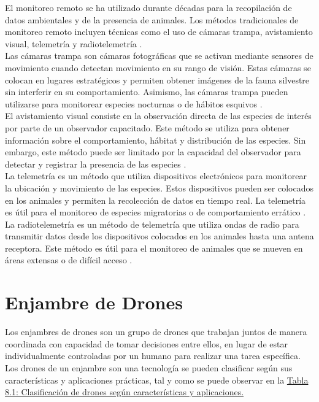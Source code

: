 El monitoreo remoto se ha utilizado durante décadas para la recopilación de datos ambientales y de la presencia de animales. Los métodos tradicionales de monitoreo remoto incluyen técnicas como el uso de cámaras trampa, avistamiento visual, telemetría y radiotelemetría \cite{46}.\\
Las cámaras trampa son cámaras fotográficas que se activan mediante sensores de movimiento cuando detectan movimiento en su rango de visión. Estas cámaras se colocan en lugares estratégicos y permiten obtener imágenes de la fauna silvestre sin interferir en su comportamiento. Asimismo, las cámaras trampa pueden utilizarse para monitorear especies nocturnas o de hábitos esquivos \cite{47}.\\
El avistamiento visual consiste en la observación directa de las especies de interés por parte de un observador capacitado. Este método se utiliza para obtener información sobre el comportamiento, hábitat y distribución de las especies. Sin embargo, este método puede ser limitado por la capacidad del observador para detectar y registrar la presencia de las especies \cite{48}.\\
La telemetría es un método que utiliza dispositivos electrónicos para monitorear la ubicación y movimiento de las especies. Estos dispositivos pueden ser colocados en los animales y permiten la recolección de datos en tiempo real. La telemetría es útil para el monitoreo de especies migratorias o de comportamiento errático \cite{49}.\\
La radiotelemetría es un método de telemetría que utiliza ondas de radio para transmitir datos desde los dispositivos colocados en los animales hasta una antena receptora. Este método es útil para el monitoreo de animales que se mueven en áreas extensas o de difícil acceso \cite{50}.

\section{Enjambre de Drones}
\label{marcodrones}
Los enjambres de drones son un grupo de drones que trabajan juntos de manera coordinada con capacidad de tomar decisiones entre ellos, en lugar de estar individualmente controladas por un humano para realizar una tarea específica. Los drones de un enjambre son una tecnología se pueden clasificar según sus características y aplicaciones prácticas, tal y como se puede observar en la \hyperref[tabla2]{Tabla 8.1: Clasificación de drones según características y aplicaciones.}

